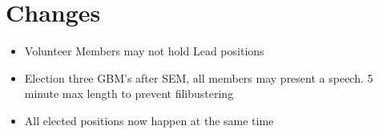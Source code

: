 \documentclass{article}
\begin{document}
\appendix
\newpage
\section{Changes}
\label{changes}
\begin{itemize}
\item Volunteer Members may not hold Lead positions
\item Election three GBM's after SEM, all members may present a speech. 5 minute max length to prevent filibustering
\item All elected positions now happen at the same time
\end{itemize}
\end{document}
